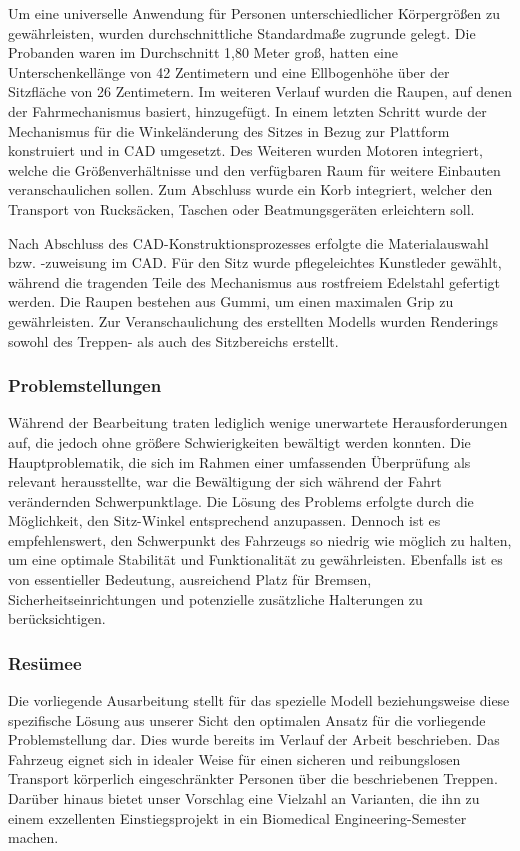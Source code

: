 \documentclass[10pt,a4paper]{article}
\begin{document}
Um eine universelle Anwendung für Personen unterschiedlicher Körpergrößen zu gewährleisten, wurden durchschnittliche Standardmaße zugrunde gelegt. Die Probanden waren im Durchschnitt 1,80 Meter groß, hatten eine Unterschenkellänge von 42 Zentimetern und eine Ellbogenhöhe über der Sitzfläche von 26 Zentimetern. Im weiteren Verlauf wurden die Raupen, auf denen der Fahrmechanismus basiert, hinzugefügt. In einem letzten Schritt wurde der Mechanismus für die Winkeländerung des Sitzes in Bezug zur Plattform konstruiert und in CAD umgesetzt. Des Weiteren wurden Motoren integriert, welche die Größenverhältnisse und den verfügbaren Raum für weitere Einbauten veranschaulichen sollen. Zum Abschluss wurde ein Korb integriert, welcher den Transport von Rucksäcken, Taschen oder Beatmungsgeräten erleichtern soll.

Nach Abschluss des CAD-Konstruktionsprozesses erfolgte die Materialauswahl bzw. -zuweisung im CAD. Für den Sitz wurde pflegeleichtes Kunstleder gewählt, während die tragenden Teile des Mechanismus aus rostfreiem Edelstahl gefertigt werden. Die Raupen bestehen aus Gummi, um einen maximalen Grip zu gewährleisten. Zur Veranschaulichung des erstellten Modells wurden Renderings sowohl des Treppen- als auch des Sitzbereichs erstellt.
\subsubsection{Problemstellungen}
Während der Bearbeitung traten lediglich wenige unerwartete Herausforderungen auf, die jedoch ohne größere Schwierigkeiten bewältigt werden konnten. Die Hauptproblematik, die sich im Rahmen einer umfassenden Überprüfung als relevant herausstellte, war die Bewältigung der sich während der Fahrt verändernden Schwerpunktlage. Die Lösung des Problems erfolgte durch die Möglichkeit, den Sitz-Winkel entsprechend anzupassen. Dennoch ist es empfehlenswert, den Schwerpunkt des Fahrzeugs so niedrig wie möglich zu halten, um eine optimale Stabilität und Funktionalität zu gewährleisten. Ebenfalls ist es von essentieller Bedeutung, ausreichend Platz für Bremsen, Sicherheitseinrichtungen und potenzielle zusätzliche Halterungen zu berücksichtigen.
\subsubsection{Resümee}
Die vorliegende Ausarbeitung stellt für das spezielle Modell beziehungsweise diese spezifische Lösung aus unserer Sicht den optimalen Ansatz für die vorliegende Problemstellung dar. Dies wurde bereits im Verlauf der Arbeit beschrieben. Das Fahrzeug eignet sich in idealer Weise für einen sicheren und reibungslosen Transport körperlich eingeschränkter Personen über die beschriebenen Treppen. Darüber hinaus bietet unser Vorschlag eine Vielzahl an Varianten, die ihn zu einem exzellenten Einstiegsprojekt in ein Biomedical Engineering-Semester machen.
\end{document}
